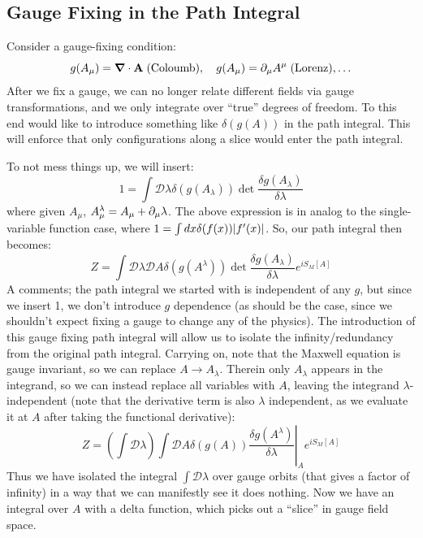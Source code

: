 \subsection{Gauge Fixing in the Path Integral}
Consider a gauge-fixing condition:
\begin{equation}
    g(A_\mu) = \nabla \cdot \v{A} \;(\text{Coloumb}),\quad g(A_\mu) = \p_\mu A^\mu \;(\text{Lorenz}), \ldots
\end{equation}
After we fix a gauge, we can no longer relate different fields via gauge transformations, and we only integrate over ``true'' degrees of freedom. To this end would like to introduce something like $\delta(g(A))$ in the path integral. This will enforce that only configurations along a slice would enter the path integral.

To not mess things up, we will insert:
\begin{equation}
    1 = \int \mathcal{D}\lambda \delta(g(A_\lambda))\det \frac{\delta g(A_\lambda)}{\delta \lambda}
\end{equation}
where given $A_\mu$, $A^\lambda_\mu = A_\mu + \partial_\mu \lambda$. The above expression is in analog to the single-variable function case, where $1 = \int dx \delta(f(x))\lvert f'(x) \rvert$. So, our path integral then becomes:
\begin{equation}
    Z = \int \mathcal{D}\lambda \mathcal{D}A \delta(g(A^\lambda))\det \frac{\delta g(A_\lambda)}{\delta \lambda}e^{iS_M[A]}
\end{equation}
A comments; the path integral we started with is independent of any $g$, but since we insert 1, we don't introduce $g$ dependence (as should be the case, since we shouldn't expect fixing a gauge to change any of the physics). The introduction of this gauge fixing path integral will allow us to isolate the infinity/redundancy from the original path integral. Carrying on, note that the Maxwell equation is gauge invariant, so we can replace $A \to A_\lambda$. Therein only $A_\lambda$ appears in the integrand, so we can instead replace all variables with $A$, leaving the integrand $\lambda$-independent (note that the derivative term is also $\lambda$ independent, as we evaluate it at $A$ after taking the functional derivative):
\begin{equation}
    Z = \left(\int \mathcal{D}\lambda\right)\int \mathcal{D}A \delta(g(A))\left.\frac{\delta g(A^\lambda)}{\delta \lambda}\right|_A e^{iS_M[A]}
\end{equation}
Thus we have isolated the integral $\int \mathcal{D}\lambda$ over gauge orbits (that gives a factor of infinity) in a way that we can manifestly see it does nothing. Now we have an integral over $A$ with a delta function, which picks out a ``slice'' in gauge field space.

